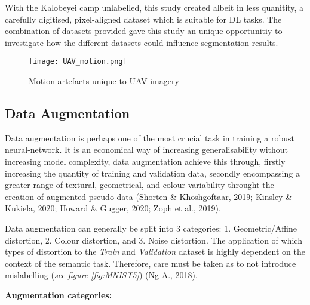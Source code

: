 \documentclass[11pt, a4paper, twoside]{report}
\begin{document}
With the Kalobeyei camp unlabelled, this study created albeit in less quanitity, a carefully digitised, pixel-aligned dataset which is suitable for DL tasks. The combination of datasets provided gave this study an unique opportunitiy to investigate how the different datasets could influence segmentation results.\\\par

\begin{figure}[H]
  \centering
  \texttt{[image: UAV\_motion.png]}
  \caption{Motion artefacts unique to UAV imagery}
  \label{fig:UAV_motion}
\end{figure}


\subsection{Data Augmentation}\label{DataAug}

Data augmentation is perhaps one of the most crucial task in training a robust neural-network. It is an economical way of increasing generalisability without increasing model complexity, data augmentation achieve this through, firstly increasing the quantity of training and validation data, secondly encompassing a greater range of textural, geometrical, and colour variability throught the creation of augmented pseudo-data (Shorten \& Khoshgoftaar, 2019; Kinsley \& Kukiela, 2020; Howard \& Gugger, 2020; Zoph et al., 2019).\\\par

Data augmentation can generally be split into 3 categories: 1. Geometric/Affine distortion, 2. Colour distortion, and 3. Noise distortion. The application of which types of distortion to the \textit{Train} and \textit{Validation} dataset is highly dependent on the context of the semantic task. Therefore, care must be taken as to not introduce mislabelling (\textit{see figure \ref{fig:MNIST5}}) (Ng A., 2018).\\\par

\textbf{Augmentation categories:}
\end{document}
